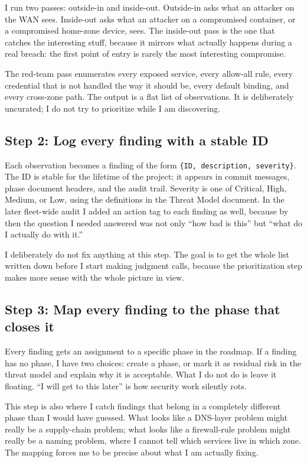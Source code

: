 \documentclass[12pt]{article}
\begin{document}
I run two passes: outside-in and inside-out. Outside-in asks what an attacker on the WAN sees. Inside-out asks what an attacker on a compromised container, or a compromised home-zone device, sees. The inside-out pass is the one that catches the interesting stuff, because it mirrors what actually happens during a real breach: the first point of entry is rarely the most interesting compromise.

The red-team pass enumerates every exposed service, every allow-all rule, every credential that is not handled the way it should be, every default binding, and every cross-zone path. The output is a flat list of observations. It is deliberately uncurated; I do not try to prioritize while I am discovering.

\subsection{Step 2: Log every finding with a stable ID}

Each observation becomes a finding of the form \texttt{\{ID, description, severity\}}. The ID is stable for the lifetime of the project; it appears in commit messages, phase document headers, and the audit trail. Severity is one of Critical, High, Medium, or Low, using the definitions in the Threat Model document. In the later fleet-wide audit I added an action tag to each finding as well, because by then the question I needed answered was not only ``how bad is this'' but ``what do I actually do with it.''

I deliberately do not fix anything at this step. The goal is to get the whole list written down before I start making judgment calls, because the prioritization step makes more sense with the whole picture in view.

\subsection{Step 3: Map every finding to the phase that closes it}

Every finding gets an assignment to a specific phase in the roadmap. If a finding has no phase, I have two choices: create a phase, or mark it as residual risk in the threat model and explain why it is acceptable. What I do not do is leave it floating. ``I will get to this later'' is how security work silently rots.

This step is also where I catch findings that belong in a completely different phase than I would have guessed. What looks like a DNS-layer problem might really be a supply-chain problem; what looks like a firewall-rule problem might really be a naming problem, where I cannot tell which services live in which zone. The mapping forces me to be precise about what I am actually fixing.
\end{document}

